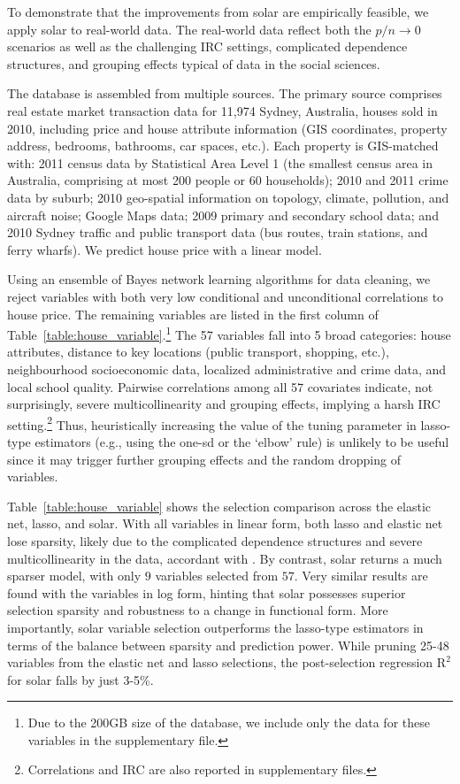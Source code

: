 \documentclass[11pt,review,authoryear]{elsarticle}
\begin{document}
To demonstrate that the improvements from solar are empirically feasible, we apply solar to real-world data. The real-world data reflect both the $p/n\rightarrow0$ scenarios as well as the challenging IRC settings, complicated dependence structures, and grouping effects typical of data in the social sciences.

The database is assembled from multiple sources. The primary source comprises real estate market transaction data for 11,974 Sydney, Australia, houses sold in 2010, including price and house attribute information (GIS coordinates, property address, bedrooms, bathrooms, car spaces, etc.). Each property is GIS-matched with: 2011 census data by Statistical Area Level 1 (the smallest census area in Australia, comprising at most 200 people or 60 households); 2010 and 2011 crime data by suburb; 2010 geo-spatial information on topology, climate, pollution, and aircraft noise; Google Maps data; 2009 primary and secondary school data; and 2010 Sydney traffic and public transport data (bus routes, train stations, and ferry wharfs). We predict house price with a linear model.

Using an ensemble of Bayes network learning algorithms for data cleaning, we reject variables with both very low conditional and unconditional correlations to house price. The remaining variables are listed in the first column of Table~\ref{table:house_variable}.\footnote{Due to the 200GB size of the database, we include only the data for these variables in the supplementary file.} The 57 variables fall into 5 broad categories: house attributes, distance to key locations (public transport, shopping, etc.), neighbourhood socioeconomic data, localized administrative and crime data, and local school quality. Pairwise correlations among all 57 covariates indicate, not surprisingly, severe multicollinearity and grouping effects, implying a harsh IRC setting.\footnote{Correlations and IRC are also reported in supplementary files.} Thus, heuristically increasing the value of the tuning parameter in lasso-type estimators (e.g., using the one-sd or the `elbow' rule) is unlikely to be useful since it may trigger further grouping effects and the random dropping of variables.

Table~\ref{table:house_variable} shows the selection comparison across the elastic net, lasso, and solar. With all variables in linear form, both lasso and elastic net lose sparsity, likely due to the complicated dependence structures and severe multicollinearity in the data, accordant with \citet{jia2010model}. By contrast, solar returns a much sparser model, with only $9$ variables selected from $57$. Very similar results are found with the variables in log form, hinting that solar possesses superior selection sparsity and robustness to a change in functional form. More importantly, solar variable selection outperforms the lasso-type estimators in terms of the balance between sparsity and prediction power. While pruning 25-48 variables from the elastic net and lasso selections, the post-selection regression $\mathrm{R}^2$ for solar falls by just 3-5\%.
\end{document}
